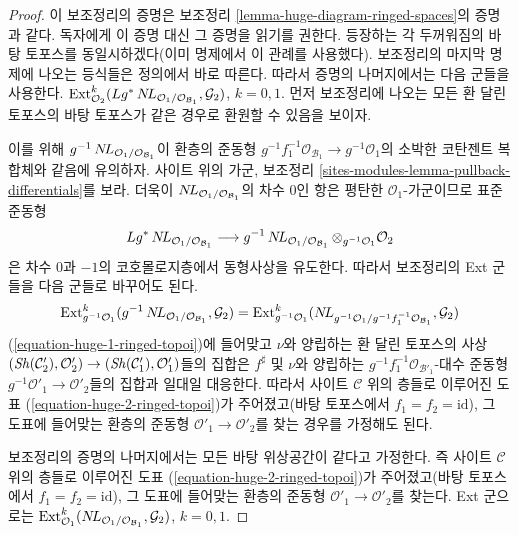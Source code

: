 \begin{proof}
이 보조정리의 증명은 보조정리
\ref{lemma-huge-diagram-ringed-spaces}의 증명과 같다. 독자에게 이 증명
대신 그 증명을 읽기를 권한다. 등장하는 각 두꺼워짐의 바탕 토포스를
동일시하겠다(이미 명제에서 이 관례를 사용했다). 보조정리의 마지막
명제에 나오는 등식들은 정의에서 바로 따른다. 따라서 증명의 나머지에서는
다음 군들을 사용한다.
$\mathop{\mathrm{Ext}}\nolimits^k_{\mathcal{O}_2}(
Lg^*\mathop{N\!L}\nolimits_{\mathcal{O}_1/\mathcal{O}_{\mathcal{B}_1}}, \mathcal{G}_2)$,
$k = 0, 1$. 먼저 보조정리에 나오는 모든 환 달린 토포스의 바탕
토포스가 같은 경우로 환원할 수 있음을 보이자.

\medskip\noindent
이를 위해 $g^{-1}\mathop{N\!L}\nolimits_{\mathcal{O}_1/\mathcal{O}_{\mathcal{B}_1}}$이
환층의 준동형
$g^{-1}f_1^{-1}\mathcal{O}_{\mathcal{B}_1} \to g^{-1}\mathcal{O}_1$의
소박한 코탄젠트 복합체와 같음에 유의하자. 사이트 위의 가군, 보조정리
\ref{sites-modules-lemma-pullback-differentials}를 보라. 더욱이
$\mathop{N\!L}\nolimits_{\mathcal{O}_1/\mathcal{O}_{\mathcal{B}_1}}$의 차수 $0$인 항은
평탄한 $\mathcal{O}_1$-가군이므로 표준 준동형
$$
Lg^*\mathop{N\!L}\nolimits_{\mathcal{O}_1/\mathcal{O}_{\mathcal{B}_1}}
\longrightarrow
g^{-1}\mathop{N\!L}\nolimits_{\mathcal{O}_1/\mathcal{O}_{\mathcal{B}_1}}
\otimes_{g^{-1}\mathcal{O}_1} \mathcal{O}_2
$$
은 차수 $0$과 $-1$의 코호몰로지층에서 동형사상을 유도한다. 따라서
보조정리의 Ext 군들을 다음 군들로 바꾸어도 된다.
$$
\mathop{\mathrm{Ext}}\nolimits^k_{g^{-1}\mathcal{O}_1}(
g^{-1}\mathop{N\!L}\nolimits_{\mathcal{O}_1/\mathcal{O}_{\mathcal{B}_1}}, \mathcal{G}_2) =
\mathop{\mathrm{Ext}}\nolimits^k_{g^{-1}\mathcal{O}_1}(
\mathop{N\!L}\nolimits_{g^{-1}\mathcal{O}_1/g^{-1}f_1^{-1}\mathcal{O}_{\mathcal{B}_1}},
\mathcal{G}_2)
$$
(\ref{equation-huge-1-ringed-topoi})에 들어맞고 $\nu$와 양립하는
환 달린 토포스의 사상
$(\mathop{\mathit{Sh}}\nolimits(\mathcal{C}'_2), \mathcal{O}'_2) \to
(\mathop{\mathit{Sh}}\nolimits(\mathcal{C}'_1), \mathcal{O}'_1)$들의 집합은 $f^\sharp$ 및 $\nu$와
양립하는
$g^{-1}f_1^{-1}\mathcal{O}_{\mathcal{B}'_1}$-대수 준동형
$g^{-1}\mathcal{O}'_1 \to \mathcal{O}'_2$들의 집합과 일대일 대응한다.
따라서 사이트 $\mathcal{C}$ 위의 층들로 이루어진 도표
(\ref{equation-huge-2-ringed-topoi})가 주어졌고(바탕 토포스에서
$f_1 = f_2 = \text{id}$), 그 도표에 들어맞는 환층의 준동형
$\mathcal{O}'_1 \to \mathcal{O}'_2$를 찾는 경우를 가정해도 된다.

\medskip\noindent
보조정리의 증명의 나머지에서는 모든 바탕 위상공간이 같다고 가정한다.
즉 사이트 $\mathcal{C}$ 위의 층들로 이루어진 도표
(\ref{equation-huge-2-ringed-topoi})가 주어졌고(바탕 토포스에서
$f_1 = f_2 = \text{id}$), 그 도표에 들어맞는 환층의 준동형
$\mathcal{O}'_1 \to \mathcal{O}'_2$를 찾는다. Ext 군으로는
$\mathop{\mathrm{Ext}}\nolimits^k_{\mathcal{O}_1}(
\mathop{N\!L}\nolimits_{\mathcal{O}_1/\mathcal{O}_{\mathcal{B}_1}}, \mathcal{G}_2)$, $k = 0, 1$.


\end{proof}
